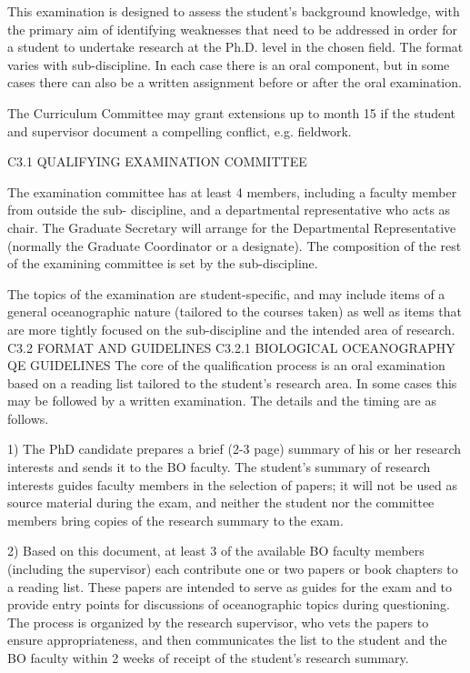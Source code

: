 This examination is designed to assess the student's background knowledge, with the primary aim of identifying weaknesses that need to be addressed in order for a student to undertake research at the Ph.D. level in the chosen field. The format varies with sub-discipline. In each case there is an oral component, but in some cases there can also be a written assignment before or after the oral examination.

The Curriculum Committee may grant extensions up to month 15 if the student and supervisor document a compelling conflict, e.g. fieldwork.
 

C3.1	QUALIFYING EXAMINATION COMMITTEE

The examination committee has at least 4 members, including a faculty member from outside the sub- discipline, and a departmental representative who acts as chair. The Graduate Secretary will arrange for the Departmental Representative (normally the Graduate Coordinator or a designate). The composition of the rest of the examining committee is set by the sub-discipline.

The topics of the examination are student-specific, and may include items of a general oceanographic nature (tailored to the courses taken) as well as items that are more tightly focused on the sub-discipline and the intended area of research.
C3.2	FORMAT AND GUIDELINES
C3.2.1  BIOLOGICAL OCEANOGRAPHY QE GUIDELINES
The core of the qualification process is an oral examination based on a reading list tailored to the student’s research area. In some cases this may be followed by a written examination. The details and the timing are as follows.

1)	The PhD candidate prepares a brief (2-3 page) summary of his or her research interests and sends it to the BO faculty. The student’s summary of research interests guides faculty members in the selection of papers; it will not be used as source material during the exam, and neither the student nor the committee members bring copies of the research summary to the exam.

2)	Based on this document, at least 3 of the available BO faculty members (including the supervisor) each contribute one or two papers or book chapters to a reading list. These papers are intended to serve as guides for the exam and to provide entry points for discussions of oceanographic topics during questioning. The process is organized by the research supervisor, who vets the papers to ensure appropriateness, and then communicates the list to the student and the BO faculty within 2 weeks of receipt of the student’s research summary.

